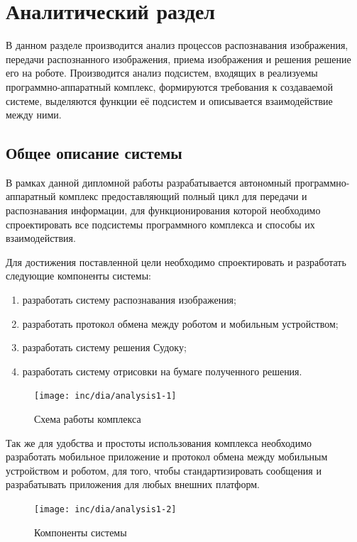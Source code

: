 \chapter{Аналитический раздел}
\label{cha:analysis}
%
%
В данном разделе производится анализ процессов распознавания изображения, передачи распознанного изображения, приема изображения и  решения решение его на роботе.
Производится анализ подсистем, входящих в реализуемы программно-аппаратный комплекс, формируются требования к создаваемой системе, выделяются функции её подсистем и описывается взаимодействие между ними.

\section{Общее описание системы}
В рамках данной дипломной работы разрабатывается автономный программно-аппаратный комплекс предоставляющий полный цикл для передачи и распознавания информации, для функционирования которой необходимо спроектировать все подсистемы программного комплекса и способы их взаимодействия.

Для достижения поставленной цели необходимо спроектировать и разработать следующие компоненты системы:
\begin{enumerate}
\item разработать систему распознавания изображения;
\item разработать протокол обмена между роботом и мобильным устройством;
\item разработать систему решения Судоку;
\item разработать систему отрисовки на бумаге полученного решения.
\end{enumerate}

\begin{figure}
  \centering
  \texttt{[image: inc/dia/analysis1-1]}
  \caption{Схема работы комплекса}
  \label{fig:fig01}
\end{figure}


Так же для удобства и простоты использования комплекса необходимо разработать мобильное приложение и протокол обмена между мобильным устройством и роботом, для того, чтобы стандартизировать сообщения и разрабатывать приложения для любых внешних платформ.

\begin{figure}
  \centering
  \texttt{[image: inc/dia/analysis1-2]}
  \caption{Компоненты системы}
  \label{fig:fig02}
\end{figure}

